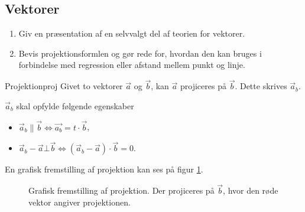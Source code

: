 \documentclass{article}
\begin{document}
\begin{tcolorbox}
    \section{Vektorer}
    \tcblower
    \begin{enumerate}
        \item Giv en præsentation af en selvvalgt del af teorien for vektorer.
        \item Bevis projektionsformlen og gør rede for, hvordan den kan bruges
            i forbindelse med regression eller afstand mellem punkt og linje.
    \end{enumerate}
\end{tcolorbox}

\begin{definition}{Projektion}{proj}
    Givet to vektorer $\vec{a}$ og $\vec{b}$, kan $\vec{a}$ projiceres på
    $\vec{b}$. Dette skrives $\vec{a}_b$.

    $\vec{a}_b$ skal opfylde følgende egenskaber
    \begin{itemize}
        \item $\vec{a}_b \parallel \vec{b} \iff \vec{a_b} = t \cdot \vec{b}$,
        \item $\vec{a}_b - \vec{a} \bot \vec{b} \iff (\vec{a}_b - \vec{a}) \cdot \vec{b} = 0$.
    \end{itemize}
\end{definition}
En grafisk fremstilling af projektion kan ses på figur \ref{projektion}.
\begin{figure}[hbt]
    \centering
    \caption{Grafisk fremstilling af projektion. Der projiceres på $\vec{b}$,
    hvor den røde vektor angiver projektionen.}
    \label{projektion}
\end{figure}
\end{document}
